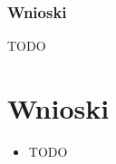 \documentclass{article}
\begin{document}
\subsubsection*{Wnioski}

TODO


\newpage
\section{Wnioski}

\begin{itemize}
	\item TODO
\end{itemize}
\end{document}
